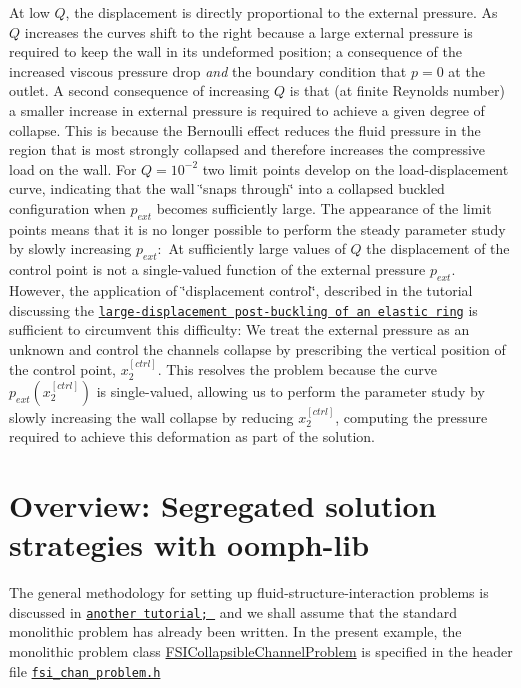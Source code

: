 At low $Q$, the displacement is directly proportional to the external pressure. As $Q$ increases the curves shift to the right because a large external pressure is required to keep the wall in its undeformed position; a consequence of the increased viscous pressure drop {\itshape and} the boundary condition that $p=0$ at the outlet. A second consequence of increasing $Q$ is that (at finite Reynolds number) a smaller increase in external pressure is required to achieve a given degree of collapse. This is because the Bernoulli effect reduces the fluid pressure in the region that is most strongly collapsed and therefore increases the compressive load on the wall. For $Q = 10^{-2}$ two limit points develop on the load-\/displacement curve, indicating that the wall \char`\"{}snaps through\char`\"{} into a collapsed buckled configuration when $p_{ext}$ becomes sufficiently large. The appearance of the limit points means that it is no longer possible to perform the steady parameter study by slowly increasing $p_{ext}: $ At sufficiently large values of $Q$ the displacement of the control point is not a single-\/valued function of the external pressure $ p_{ext}$. However, the application of \char`\"{}displacement control\char`\"{}, described in the tutorial discussing the \href{../../../beam/steady_ring/html/index.html}{\tt large-\/displacement post-\/buckling of an elastic ring} is sufficient to circumvent this difficulty\+: We treat the external pressure as an unknown and control the channel\textquotesingle{}s collapse by prescribing the vertical position of the control point, $ x_2^{[ctrl]}.$ This resolves the problem because the curve $ p_{ext}(x_2^{[ctrl]})$ is single-\/valued, allowing us to perform the parameter study by slowly increasing the wall collapse by reducing $ x_2^{[ctrl]}$, computing the pressure required to achieve this deformation as part of the solution.



 

\hypertarget{index_overview}{}\section{Overview\+: Segregated solution strategies with oomph-\/lib}\label{index_overview}
The general methodology for setting up fluid-\/structure-\/interaction problems is discussed in \href{../../fsi_collapsible_channel/html/index.html#overview}{\tt another tutorial; } and we shall assume that the standard monolithic problem has already been written. In the present example, the monolithic problem class {\ttfamily \hyperlink{classFSICollapsibleChannelProblem}{F\+S\+I\+Collapsible\+Channel\+Problem}} is specified in the header file \href{../../../../demo_drivers/interaction/fsi_channel_seg_and_precond/fsi_chan_problem.h}{\tt fsi\+\_\+chan\+\_\+problem.\+h}

